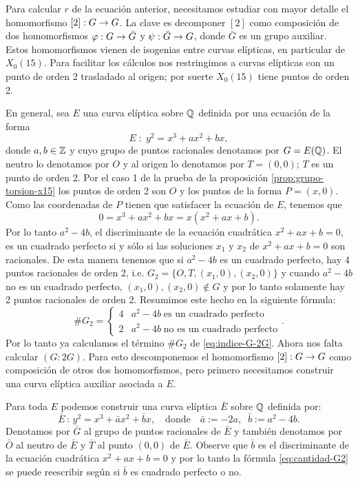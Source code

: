 \documentclass[../../tesis_maestria]{subfiles}
\begin{document}
Para calcular $r$ de la ecuación anterior, necesitamos estudiar con mayor detalle el homomorfismo $[2]:G\rightarrow G$. La clave es decomponer $[2]$ como composición de dos homomorfismos $\varphi:G\rightarrow \bar{G}$ y $\psi:\bar{G}\rightarrow G$, donde $\bar{G}$ es un grupo auxiliar. Estos homomorfismos vienen de isogenias entre curvas elípticas, en particular de $X_0(15)$. Para facilitar los cálculos nos restringimos a curvas elípticas con un punto de orden 2 trasladado al origen; por suerte $X_0(15)$ tiene puntos de orden 2.

En general, sea $E$ una curva elíptica sobre $\mathbb{Q}$ definida por una ecuación de la forma
\[
	E\; :\; y^2=x^3+ax^2+bx,
\]
donde $a,b\in\mathbb{Z}$ y cuyo grupo de puntos racionales denotamos por $G=E(\mathbb{Q})$. El neutro lo denotamos por $O$ y al origen lo denotamos por $T=(0,0)$; $T$ es un punto de orden 2. Por el caso 1 de la prueba de la proposición \ref{prop:grupo-torsion-x15} los puntos de orden 2 son $O$ y los puntos de la forma $P=(x,0)$. Como las coordenadas de $P$ tienen que satisfacer la ecuación de $E$, tenemos que
\[
	0=x^3+ax^2+bx=x(x^2+ax+b).
\]
Por lo tanto $a^2-4b$, el discriminante de la ecuación cuadrática $x^2+ax+b=0$, es un cuadrado perfecto si y sólo si las soluciones $x_1$ y $x_2$ de $x^2+ax+b=0$ son racionales. De esta manera tenemos que si $a^2-4b$ es un cuadrado perfecto, hay 4 puntos racionales de orden 2, i.e. $G_2=\{O,T,(x_1,0),(x_2,0)\}$ y cuando $a^2-4b$ no es un cuadrado perfecto, $(x_1,0),(x_2,0)\not\in G$ y por lo tanto solamente hay 2 puntos racionales de orden 2. Resumimos este hecho en la siguiente fórmula:
\begin{equation}\label{eq:cantidad-G2}
	\# G_2=	\begin{cases}
		4 & a^2-4b\;\text{es un cuadrado perfecto}\\
		2 & a^2-4b\;\text{no es un cuadrado perfecto}
	\end{cases}.
\end{equation}
Por lo tanto ya calculamos el término $\# G_2$ de \eqref{eq:indice-G-2G}. Ahora nos falta calcular $(G:2G)$. Para esto descomponemos el homomorfismo $[2]:G\rightarrow G$ como composición de otros dos homomorfismos, pero primero necesitamos construir una curva elíptica auxiliar asociada a $E$.

Para toda $E$ podemos construir una curva elíptica $\bar{E}$ sobre $\mathbb{Q}$ definida por:
\[
	\bar{E}\,:\, y^2=x^3+\bar{a}x^2+\bar{b}x,\quad\text{donde}\quad \bar{a}:=-2a,\;\;\bar{b}:=a^2-4b.
\]
Denotamos por $\bar{G}$ al grupo de puntos racionales de $\bar{E}$ y también denotamos por $\bar{O}$ al neutro de $\bar{E}$ y $\bar{T}$ al punto $(0,0)$ de $\bar{E}$. Observe que $\bar{b}$ es el discriminante de la ecuación cuadrática $x^2+ax+b=0$ y por lo tanto la fórmula \eqref{eq:cantidad-G2} se puede reescribir según si $\bar{b}$ es cuadrado perfecto o no.
\end{document}
